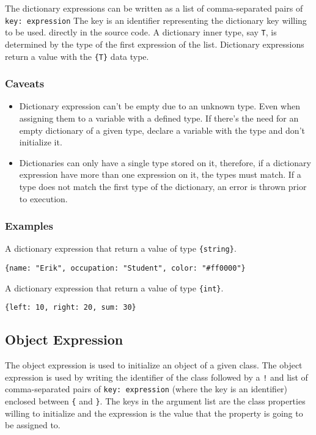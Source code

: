 The dictionary expressions can be written as a list of comma-separated pairs of \texttt{key: expression}
The key is an identifier representing the dictionary key willing to be used.
directly in the source code. A dictionary inner type, say \texttt{T}, is determined by the type of the first expression of the list.
Dictionary expressions return a value with the \texttt{\{T\}} data type.

\subsubsection{Caveats}

\begin{itemize}
    \item Dictionary expression can't be empty due to an unknown type. Even when assigning them to a variable with a defined type. If there's the
        need for an empty dictionary of a given type, declare a variable with the type and don't initialize it.
    \item Dictionaries can only have a single type stored on it, therefore, if a dictionary expression have more than one expression on it, the types
        must match. If a type does not match the first type of the dictionary, an error is thrown prior to execution.
\end{itemize}

\subsubsection{Examples}

A dictionary expression that return a value of type \texttt{\{string\}}.
\begin{lstlisting}
{name: "Erik", occupation: "Student", color: "#ff0000"}
\end{lstlisting}
A dictionary expression that return a value of type \texttt{\{int\}}.
\begin{lstlisting}
{left: 10, right: 20, sum: 30}
\end{lstlisting}

\subsection{Object Expression}
\label{sec:object_expression}

The object expression is used to initialize an object of a given class. The object expression is used by writing the identifier of the class followed by
a \texttt{!} and list of comma-separated pairs of \texttt{key: expression} (where the key is an identifier) enclosed between \texttt{\{} and \texttt{\}}.
The keys in the argument list are the class properties willing to initialize and the expression is the value that the property is going to be assigned to.

